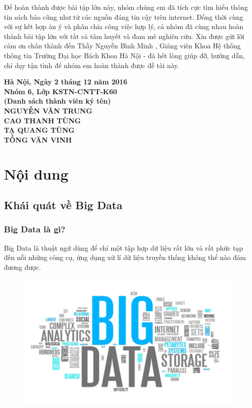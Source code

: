 \documentclass[12pt]{report}
\begin{document}
Để hoàn thành được bài tập lớn này, nhóm chúng em đã tích cực tìm hiểu thông tin sách báo cũng như  từ các nguồn đáng tin cậy trên internet. Đồng thời cùng với sự kết hợp ăn ý và phân chia công việc hợp lý, cả nhóm đã cùng nhau hoàn thành bài tập lớn với tất cả tâm huyết và đam mê nghiên cứu. Xin được gửi lời cảm ơn chân thành đến Thầy Nguyễn Bình Minh , Giảng viên Khoa Hệ thống thông tin Trường Đại học Bách Khoa Hà Nội - đã hết lòng giúp đỡ, hướng dẫn, chỉ dạy tận tình để nhóm em hoàn thành được đề tài này.
\newpage
\begin{flushright}
\bfseries
Hà Nội, Ngày 2 tháng 12 năm 2016 \\
\vspace{0.5cm}
Nhóm 6, Lớp KSTN-CNTT-K60 \\
(Danh sách thành viên ký tên) \\
\vspace{4mm}
NGUYỄN VĂN TRUNG \\
\vspace{13mm}
CAO THANH TÙNG \\
\vspace{13mm}
TẠ QUANG TÙNG \\
\vspace{13mm}
TỐNG VĂN VINH
\newpage

\end{flushright}

\chapter*{Nội dung}
\section{Khái quát về Big Data}
\subsection{Big Data là gì?}

Big Data là thuật ngữ dùng để chỉ một tập hợp dữ liệu rất lớn và rất phức tạp đến nỗi những công cụ, ứng dụng xử lí dữ liệu truyền thống không thể nào đảm đương được. \cite{definition}

\begin{figure}[H]
\centering
\includegraphics[scale=1]{big_data.png}
\caption{ }
\end{figure}
\end{document}
